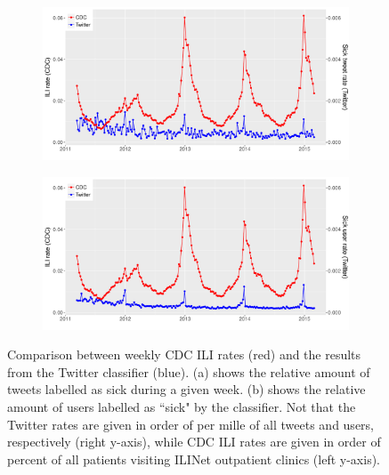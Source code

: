 \documentclass[11pt, a4paper,twoside]{report}\usepackage[]{graphicx}\usepackage[]{color}
\begin{document}
\begin{figure}[htbp!]
\centering
  \begin{subfigure}[t]{1\textwidth}
  \includegraphics[width=1\linewidth]{24_cdc_twitter_comp_nat_raw.pdf}
  \caption{}
  \end{subfigure}
\hfill
  \begin{subfigure}[t]{1\textwidth}
  \includegraphics[width=1\linewidth]{25_cdc_twitter_comp_nat_raw_user.pdf}
  \caption{}
  \end{subfigure}
  \caption{Comparison between weekly CDC ILI rates (red) and the results from the Twitter classifier (blue). (a) shows the relative amount of tweets labelled as sick during a given week. (b) shows the relative amount of users labelled as ``sick" by the classifier. Not that the Twitter rates are given in order of per mille of all tweets and users, respectively (right y-axis), while CDC ILI rates are given in order of percent of all patients visiting ILINet outpatient clinics (left y-axis).}
  \label{fig:naive_comparison_CDC_twitter}
\end{figure}
\end{document}
